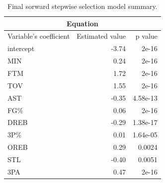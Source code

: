 \begin{table}[H]
	\centering
	\begin{tabular}{|| l | r | r ||} 
		\hline
		\multicolumn{3}{|c|}{Equation} \\
		\hline
		Variable's coefficient & Estimated value & p value \\
		\hline
		intercept & -3.74 & 2e-16 \\
		MIN & 0.24 & 2e-16 \\
		FTM & 1.72 & 2e-16 \\
		TOV & 1.55 & 2e-16 \\
		AST & -0.35 & 4.58e-13 \\
		FG\% & 0.06 & 2e-16 \\
		DREB & -0.29 & 1.38e-17 \\
		3P\% & 0.01 & 1.64e-05 \\
		OREB & 0.29 & 0.0024 \\
		STL & -0.40 & 0.0051 \\
		3PA & 0.47 & 2e-16 \\
		\hline
	\end{tabular}
	\caption{Final sorward stepwise selection model summary.}
	\label{table:ForwardFinalModelSummary}
\end{table}

